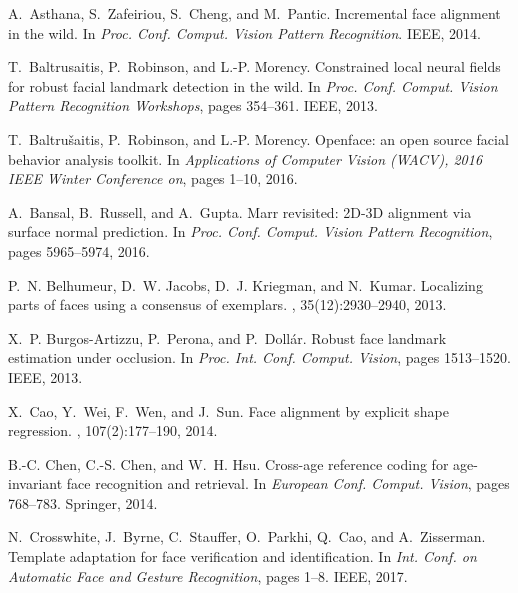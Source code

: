 \documentclass[10pt,twocolumn,letterpaper]{article}
\begin{document}
{\small

%
\begin{thebibliography}{10}\itemsep=-1pt
A.~Asthana, S.~Zafeiriou, S.~Cheng, and M.~Pantic.
\newblock Incremental face alignment in the wild.
\newblock In {\em Proc. Conf. Comput. Vision Pattern Recognition}. IEEE, 2014.

T.~Baltrusaitis, P.~Robinson, and L.-P. Morency.
\newblock Constrained local neural fields for robust facial landmark detection
  in the wild.
\newblock In {\em Proc. Conf. Comput. Vision Pattern Recognition Workshops},
  pages 354--361. IEEE, 2013.

T.~Baltru{\v{s}}aitis, P.~Robinson, and L.-P. Morency.
\newblock Openface: an open source facial behavior analysis toolkit.
\newblock In {\em Applications of Computer Vision (WACV), 2016 IEEE Winter
  Conference on}, pages 1--10, 2016.

A.~Bansal, B.~Russell, and A.~Gupta.
\newblock Marr revisited: {2D}-{3D} alignment via surface normal prediction.
\newblock In {\em Proc. Conf. Comput. Vision Pattern Recognition}, pages
  5965--5974, 2016.

P.~N. Belhumeur, D.~W. Jacobs, D.~J. Kriegman, and N.~Kumar.
\newblock Localizing parts of faces using a consensus of exemplars.
, 35(12):2930--2940, 2013.

X.~P. Burgos-Artizzu, P.~Perona, and P.~Doll{\'a}r.
\newblock Robust face landmark estimation under occlusion.
\newblock In {\em Proc. Int. Conf. Comput. Vision}, pages 1513--1520. IEEE,
  2013.

X.~Cao, Y.~Wei, F.~Wen, and J.~Sun.
\newblock Face alignment by explicit shape regression.
, 107(2):177--190, 2014.

B.-C. Chen, C.-S. Chen, and W.~H. Hsu.
\newblock Cross-age reference coding for age-invariant face recognition and
  retrieval.
\newblock In {\em European Conf. Comput. Vision}, pages 768--783. Springer,
  2014.

N.~Crosswhite, J.~Byrne, C.~Stauffer, O.~Parkhi, Q.~Cao, and A.~Zisserman.
\newblock Template adaptation for face verification and identification.
\newblock In {\em Int. Conf. on Automatic Face and Gesture Recognition}, pages
  1--8. IEEE, 2017.


\end{thebibliography}}
\end{document}

